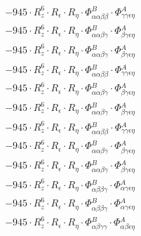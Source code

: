 \documentclass{article}
\begin{document}
\begin{subequations}
\begin{gather}
\begin{array}{c}
 \\[0.2em] 		 - 945 \cdot R_{z}^{6} \cdot R_{\epsilon{}} \cdot R_{\eta{}} \cdot \Phi{}^{B}_{\alpha{}\alpha{}\beta{}\beta{}} \cdot \Phi{}^{A}_{\gamma{}\gamma{}\epsilon{}\eta{}} 
 \\[0.2em] 		 - 945 \cdot R_{z}^{6} \cdot R_{\epsilon{}} \cdot R_{\eta{}} \cdot \Phi{}^{B}_{\alpha{}\alpha{}\beta{}\gamma{}} \cdot \Phi{}^{A}_{\beta{}\gamma{}\epsilon{}\eta{}} 
 \\[0.2em] 		 - 945 \cdot R_{z}^{6} \cdot R_{\epsilon{}} \cdot R_{\eta{}} \cdot \Phi{}^{B}_{\alpha{}\alpha{}\beta{}\gamma{}} \cdot \Phi{}^{A}_{\beta{}\gamma{}\epsilon{}\eta{}} 
 \\[0.2em] 		 - 945 \cdot R_{z}^{6} \cdot R_{\epsilon{}} \cdot R_{\eta{}} \cdot \Phi{}^{B}_{\alpha{}\alpha{}\beta{}\beta{}} \cdot \Phi{}^{A}_{\gamma{}\gamma{}\epsilon{}\eta{}} 
 \\[0.2em] 		 - 945 \cdot R_{z}^{6} \cdot R_{\epsilon{}} \cdot R_{\eta{}} \cdot \Phi{}^{B}_{\alpha{}\alpha{}\beta{}\gamma{}} \cdot \Phi{}^{A}_{\beta{}\gamma{}\epsilon{}\eta{}} 
 \\[0.2em] 		 - 945 \cdot R_{z}^{6} \cdot R_{\epsilon{}} \cdot R_{\eta{}} \cdot \Phi{}^{B}_{\alpha{}\alpha{}\beta{}\gamma{}} \cdot \Phi{}^{A}_{\beta{}\gamma{}\epsilon{}\eta{}} 
 \\[0.2em] 		 - 945 \cdot R_{z}^{6} \cdot R_{\epsilon{}} \cdot R_{\eta{}} \cdot \Phi{}^{B}_{\alpha{}\alpha{}\beta{}\beta{}} \cdot \Phi{}^{A}_{\gamma{}\gamma{}\epsilon{}\eta{}} 
 \\[0.2em] 		 - 945 \cdot R_{z}^{6} \cdot R_{\epsilon{}} \cdot R_{\eta{}} \cdot \Phi{}^{B}_{\alpha{}\alpha{}\beta{}\gamma{}} \cdot \Phi{}^{A}_{\beta{}\gamma{}\epsilon{}\eta{}} 
 \\[0.2em] 		 - 945 \cdot R_{z}^{6} \cdot R_{\epsilon{}} \cdot R_{\eta{}} \cdot \Phi{}^{B}_{\alpha{}\alpha{}\beta{}\gamma{}} \cdot \Phi{}^{A}_{\beta{}\gamma{}\epsilon{}\eta{}} 
 \\[0.2em] 		 - 945 \cdot R_{z}^{6} \cdot R_{\epsilon{}} \cdot R_{\eta{}} \cdot \Phi{}^{B}_{\alpha{}\beta{}\beta{}\gamma{}} \cdot \Phi{}^{A}_{\alpha{}\gamma{}\epsilon{}\eta{}} 
 \\[0.2em] 		 - 945 \cdot R_{z}^{6} \cdot R_{\epsilon{}} \cdot R_{\eta{}} \cdot \Phi{}^{B}_{\alpha{}\beta{}\beta{}\gamma{}} \cdot \Phi{}^{A}_{\alpha{}\gamma{}\epsilon{}\eta{}} 
 \\[0.2em] 		 - 945 \cdot R_{z}^{6} \cdot R_{\epsilon{}} \cdot R_{\eta{}} \cdot \Phi{}^{B}_{\alpha{}\beta{}\gamma{}\gamma{}} \cdot \Phi{}^{A}_{\alpha{}\beta{}\epsilon{}\eta{}} 

\end{array}
\end{gather}
\end{subequations}
\end{document}

